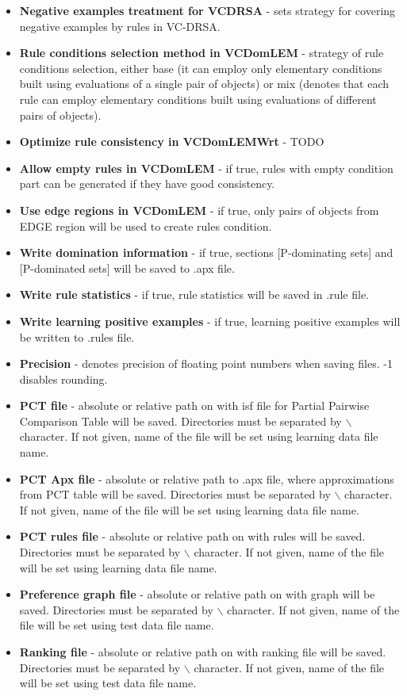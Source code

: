 \begin{itemize}
	\item \textbf{Negative examples treatment for VCDRSA} - sets strategy for covering negative examples by rules in VC-DRSA.
	\item \textbf{Rule conditions selection method in VCDomLEM} - strategy of rule conditions selection, either base (it can employ only elementary conditions built using evaluations of a single pair of objects) or mix (denotes that each rule can employ elementary conditions built using evaluations of different pairs of objects).
	\item \textbf{Optimize rule consistency in VCDomLEMWrt} - TODO
	\item \textbf{Allow empty rules in VCDomLEM} - if true, rules with empty condition part can be generated if they have good consistency.
	\item \textbf{Use edge regions in VCDomLEM} - if true, only pairs of objects from EDGE region will be used to create rules condition.
	\item \textbf{Write domination information} - if true, sections [P-dominating sets] and [P-dominated sets] will be saved to .apx file.
	\item \textbf{Write rule statistics} - if true, rule statistics will be saved in .rule file.
	\item \textbf{Write learning positive examples} - if true, learning positive examples will be written to .rules file.
	\item \textbf{Precision} - denotes precision of floating point numbers when saving files. -1 disables rounding.
	\item \textbf{PCT file} - absolute or relative path on with isf file for Partial Pairwise Comparison Table will be saved. Directories must be separated by $\backslash$ character. If not given, name of the file will be set using learning data file name.
	\item \textbf{PCT Apx file} - absolute or relative path to .apx file, where approximations from PCT table will be saved. Directories must be separated by $\backslash$ character. If not given, name of the file will be set using learning data file name.
	\item \textbf{PCT rules file} - absolute or relative path on with rules will be saved. Directories must be separated by $\backslash$ character. If not given, name of the file will be set using learning data file name.
	\item \textbf{Preference graph file} - absolute or relative path on with graph will be saved. Directories must be separated by $\backslash$ character. If not given, name of the file will be set using test data file name.
	\item \textbf{Ranking file} - absolute or relative path on with ranking file will be saved. Directories must be separated by $\backslash$ character. If not given, name of the file will be set using test data file name.
\end{itemize}

